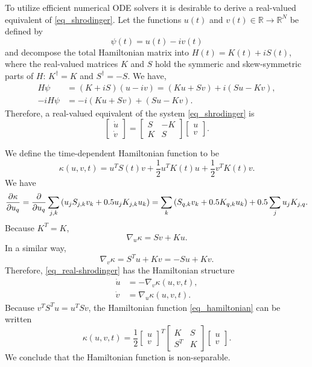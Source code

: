 \documentclass[11pt]{article}
\begin{document}
To utilize efficient numerical ODE solvers it is desirable to derive a real-valued equivalent of
\eqref{eq_shrodinger}. Let the functions $u(t)$ and $v(t) \in \mathbb{R} \to \mathbb{R}^N$ be
defined by
\[
\psi(t) = u(t) - iv(t)
\]
and decompose the total Hamiltonian matrix into $H(t) = K(t) + i S(t)$, where the real-valued
matrices $K$ and $S$ hold the symmeric and skew-symmetric parts of $H$: $K^\dag = K$ and $S^\dag =
-S$. We have,
\begin{align*}
H\psi &= (K+iS)(u - iv) = (Ku + Sv) + i(Su - Kv),\\
-iH\psi &= -i(Ku + Sv) + (Su - Kv).
\end{align*}
Therefore, a real-valued equivalent of the system \eqref{eq_shrodinger} is
\begin{equation}\label{eq_real-shrodinger}
  \begin{bmatrix} \dot{u}\\ \dot{v} \end{bmatrix} =
%
  \begin{bmatrix}
    S & -K \\ K & S
  \end{bmatrix}     
  \begin{bmatrix} u\\ v \end{bmatrix} .
\end{equation}

We define the time-dependent Hamiltonian function to be
\begin{equation}\label{eq_hamiltonian}
\kappa(u,v,t) = u^T S(t) v + \frac{1}{2} u^T K(t) u + \frac{1}{2} v^T K(t) v.
\end{equation}
We have
\[
\frac{\p\kappa}{\p u_q} =
%
\frac{\p}{\p u_q} \sum_{j,k} \left( u_j S_{j,k} v_k + 0.5 u_j K_{j,k} u_k \right) =
%
\sum_{k} \left( S_{q,k} v_k + 0.5 K_{q,k} u_k \right) + 0.5 \sum_{j} u_j K_{j,q}.
\]
Because $K^T = K$,
\[
\nabla_u \kappa = S v + K u.
\]
In a similar way,
\[
\nabla_v \kappa = S^T u + K v = -S u + Kv.
\]
Therefore, \eqref{eq_real-shrodinger} has the Hamiltonian structure
\begin{align}
  \dot{u} &= -\nabla_v \kappa(u,v,t),\\
  \dot{v} &= \nabla_u \kappa(u,v,t).
\end{align}
Because $v^TS^Tu = u^TSv$, the Hamiltonian function \eqref{eq_hamiltonian} can be written
\[
\kappa(u,v,t) = \frac{1}{2} \begin{bmatrix} u \\ v \end{bmatrix}^T
%
\begin{bmatrix}
  K & S \\ S^T & K
\end{bmatrix}
\begin{bmatrix} u \\ v \end{bmatrix}.
\]
We conclude that the Hamiltonian function is non-separable. 
\end{document}
